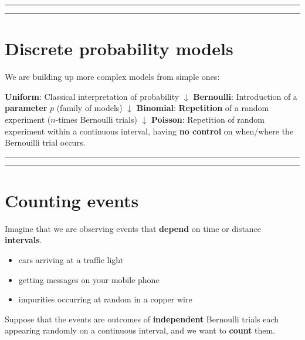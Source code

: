 \documentclass[
]{book}
\providecommand{\tightlist}{%
  \setlength{\itemsep}{0pt}\setlength{\parskip}{0pt}}
\begin{document}
\begin{center}\rule{0.5\linewidth}{0.5pt}\end{center}

\begin{center}\rule{0.5\linewidth}{0.5pt}\end{center}

\hypertarget{discrete-probability-models-1}{%
\section{Discrete probability models}\label{discrete-probability-models-1}}

We are building up more complex models from simple ones:

\textbf{Uniform}: Classical interpretation of probability
\(\downarrow\)
\textbf{Bernoulli}: Introduction of a \textbf{parameter} \(p\) (family of models)
\(\downarrow\)
\textbf{Binomial}: \textbf{Repetition} of a random experiment (\(n\)-times Bernoulli trials)
\(\downarrow\)
\textbf{Poisson}: Repetition of random experiment within a continuous interval, having \textbf{no control} on when/where the Bernouilli trial occurs.

\begin{center}\rule{0.5\linewidth}{0.5pt}\end{center}

\begin{center}\rule{0.5\linewidth}{0.5pt}\end{center}

\hypertarget{counting-events}{%
\section{Counting events}\label{counting-events}}

Imagine that we are observing events that \textbf{depend} on time or distance \textbf{intervals}.

\begin{itemize}
\tightlist
\item
  cars arriving at a traffic light
\item
  getting messages on your mobile phone
\item
  impurities occurring at random in a copper wire
\end{itemize}

Suppose that the events are outcomes of \textbf{independent} Bernoulli trials each appearing randomly on a continuous interval, and we want to \textbf{count} them.
\end{document}

